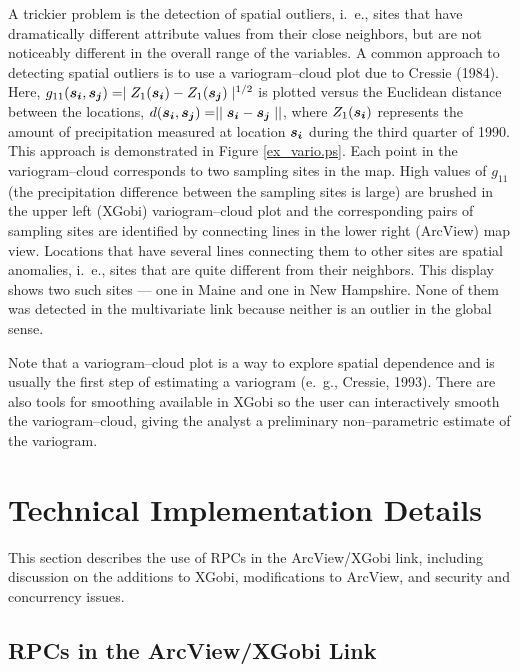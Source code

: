 A trickier problem is the detection of spatial outliers, i.~e., sites that
have dramatically different attribute values from their close
neighbors, but are not noticeably different in the overall range of the
variables.  A common approach to detecting spatial outliers is to use
a variogram--cloud plot due to Cressie (1984). Here, $g_{11}
(\mbox{\boldmath$s_i$}, \mbox{\boldmath$s_j$}) = \mid Z_1
(\mbox{\boldmath$s_i$}) - Z_1 (\mbox{\boldmath$s_j$}) \mid^{1/2}$ is
plotted versus the Euclidean distance between the locations, $d
(\mbox{\boldmath$s_i$}, \mbox{\boldmath$s_j$}) = \mid\mid
\mbox{\boldmath$s_i$} - \mbox{\boldmath$s_j$} \mid\mid$, where $Z_1
(\mbox{\boldmath$s_i$})$ represents the amount of precipitation
measured at location $\mbox{\boldmath$s_i$}$ during the third quarter
of 1990. This approach is demonstrated in Figure
\ref{ex_vario.ps}. Each point in the variogram--cloud corresponds to
two sampling sites in the map. High values of $g_{11}$ (the
precipitation difference between the sampling sites is large) are
brushed in the upper left (XGobi) variogram--cloud plot and the
corresponding pairs of sampling sites are identified by connecting
lines in the lower right (ArcView) map view. Locations that have
several lines connecting them to other sites are spatial anomalies,
i.~e., sites that are quite different
from their neighbors. This display shows
two such sites --- one in Maine and one in New Hampshire. None of them
was detected in the multivariate link because neither is an outlier
in the global sense.

Note that a variogram--cloud plot is a way to explore
spatial dependence and is usually the first
step of estimating a variogram (e.~g., Cressie, 1993). 
There are also tools for smoothing available in XGobi so 
the user can interactively smooth the variogram--cloud,
giving the analyst
a preliminary non--parametric estimate of the variogram.


\section{Technical Implementation Details}

This section describes the use of RPCs in the ArcView/XGobi link,
including discussion on the
additions to XGobi, modifications to ArcView, 
and security and concurrency issues.

\subsection{RPCs in the ArcView/XGobi Link}

